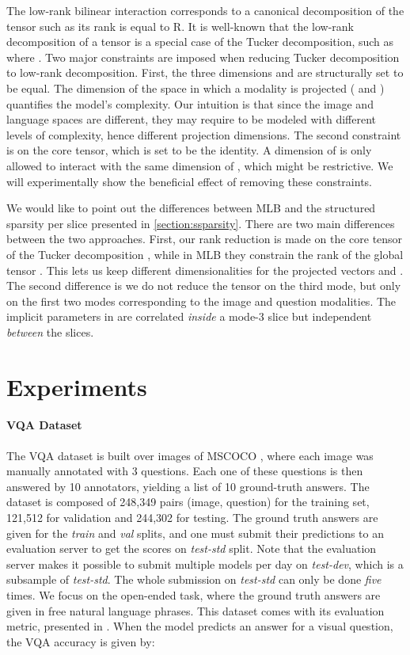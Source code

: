 \documentclass[10pt,twocolumn,letterpaper]{article}
\begin{document}
The low-rank bilinear interaction corresponds to a canonical decomposition of the tensor  such as its rank is equal to R. It is well-known that the low-rank decomposition of a tensor is a special case of the Tucker decomposition, such as 
where . Two major constraints are imposed when reducing Tucker decomposition to low-rank decomposition. First, the three dimensions  and  are structurally set to be equal. The dimension of the space in which a modality is projected ( and ) quantifies the model's complexity. Our intuition is that since the image and language spaces are different, they may require to be modeled with different levels of complexity, hence different projection dimensions. The second constraint is on the core tensor, which is set to be the identity. A dimension  of  is only allowed to interact with the same dimension of , which might be restrictive. We will experimentally show the beneficial effect of removing these constraints.

We would like to point out the differences between MLB and the structured sparsity per slice presented in \ref{section:ssparsity}. There are two main differences between the two approaches. First, our rank reduction is made on the core tensor of the Tucker decomposition , while in MLB they constrain the rank of the global tensor . This lets us keep different dimensionalities for the projected vectors  and . The second difference is we do not reduce the tensor on the third mode, but only on the first two modes corresponding to the image and question modalities. The implicit parameters in  are correlated \emph{inside} a mode-3 slice but independent \emph{between} the slices.
 
\section{Experiments}
\label{sec:expes}
\paragraph{VQA Dataset}
The VQA dataset \cite{VQA} is built over images of MSCOCO \cite{mscoco}, where each image was manually annotated with 3 questions. Each one of these questions is then answered by 10 annotators, yielding a list of 10 ground-truth answers.
The dataset is composed of 248,349 pairs (image, question) for the training set, 121,512 for validation and 244,302 for testing. The ground truth answers are given for the \textit{train} and \textit{val} splits, and one must submit their predictions to an evaluation server to get the scores on \textit{test-std} split. Note that the evaluation server makes it possible to submit multiple models per day on \textit{test-dev}, which is a subsample of \textit{test-std}. The whole submission on \textit{test-std} can only be done \emph{five} times. We focus on the open-ended task, where the ground truth answers are given in free natural language phrases. This dataset comes with its evaluation metric, presented in \cite{VQA}. When the model predicts an answer for a visual question, the VQA accuracy is given by: 
\end{document}
